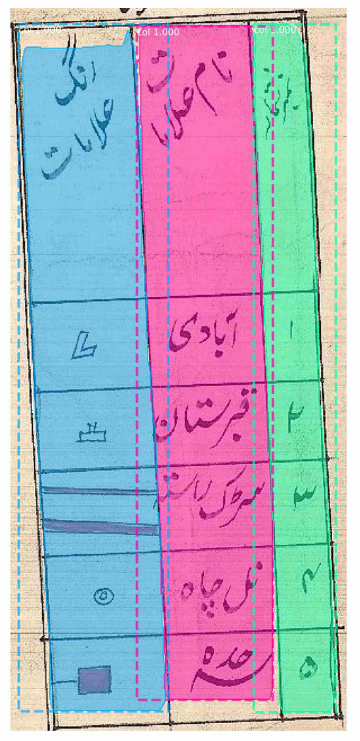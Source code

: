 \begin{figure}[h!]
\begin{subfigure}{0.325\linewidth}
    \caption{}
    \label{}
\end{subfigure}
\begin{subfigure}{0.325\linewidth}
  \centering
  \includegraphics[width=\linewidth]{massavi_1525_0_col_mask.jpg}

\end{subfigure}
\end{figure}
